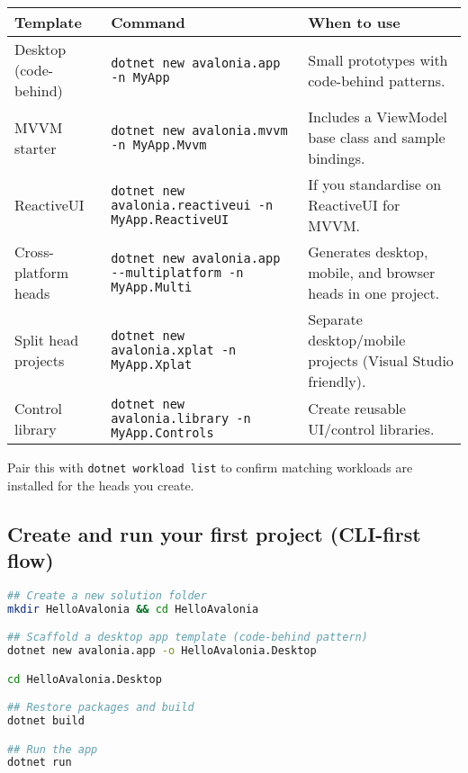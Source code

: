 \begin{longtable}[]{@{}
  >{\raggedright\arraybackslash}p{}
  >{\raggedright\arraybackslash}p{}
  >{\raggedright\arraybackslash}p{}@{}}
\toprule\noalign{}
\begin{minipage}[b]{\linewidth}\raggedright
Template
\end{minipage} & \begin{minipage}[b]{\linewidth}\raggedright
Command
\end{minipage} & \begin{minipage}[b]{\linewidth}\raggedright
When to use
\end{minipage} \\
\midrule\noalign{}
\endhead
\bottomrule\noalign{}
\endlastfoot
Desktop (code-behind) &
\passthrough{\lstinline!dotnet new avalonia.app -n MyApp!} & Small
prototypes with code-behind patterns. \\
MVVM starter &
\passthrough{\lstinline!dotnet new avalonia.mvvm -n MyApp.Mvvm!} &
Includes a ViewModel base class and sample bindings. \\
ReactiveUI &
\passthrough{\lstinline!dotnet new avalonia.reactiveui -n MyApp.ReactiveUI!}
& If you standardise on ReactiveUI for MVVM. \\
Cross-platform heads &
\passthrough{\lstinline!dotnet new avalonia.app --multiplatform -n MyApp.Multi!}
& Generates desktop, mobile, and browser heads in one project. \\
Split head projects &
\passthrough{\lstinline!dotnet new avalonia.xplat -n MyApp.Xplat!} &
Separate desktop/mobile projects (Visual Studio friendly). \\
Control library &
\passthrough{\lstinline!dotnet new avalonia.library -n MyApp.Controls!}
& Create reusable UI/control libraries. \\
\end{longtable}

Pair this with \passthrough{\lstinline!dotnet workload list!} to confirm
matching workloads are installed for the heads you create.

\subsection{Create and run your first project (CLI-first
flow)}\label{create-and-run-your-first-project-cli-first-flow}

\begin{lstlisting}[language=bash]
## Create a new solution folder
mkdir HelloAvalonia && cd HelloAvalonia

## Scaffold a desktop app template (code-behind pattern)
dotnet new avalonia.app -o HelloAvalonia.Desktop

cd HelloAvalonia.Desktop

## Restore packages and build
dotnet build

## Run the app
dotnet run
\end{lstlisting}

